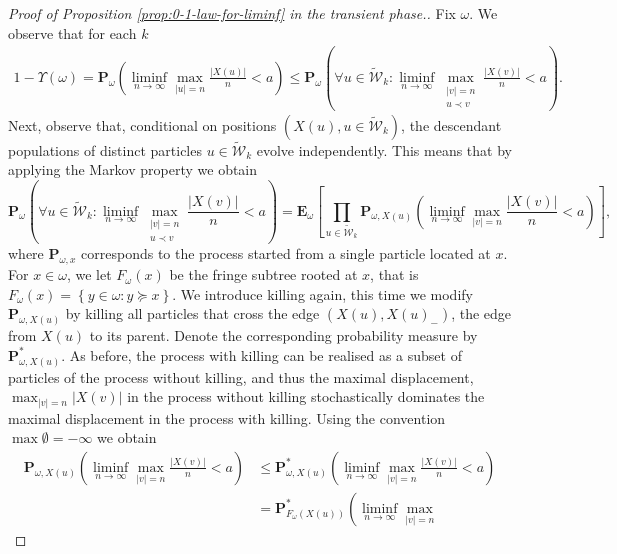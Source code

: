 \documentclass[11 pt]{article}
\theoremstyle{definition}
\numberwithin{equation}{section}
\begin{document}
\begin{proof}[Proof of Proposition \ref{prop:0-1-law-for-liminf} in the transient phase.]
	Fix $\omega$. We observe that for each $k$
	\begin{align*}
    		1-\Upsilon(\omega) = \mathbf{P}_\omega \left( \liminf_{n \to \infty} \max_{\vert u \vert =n} \frac{\vert
		 X(u) \vert}{n} <a\right) 
    		\leq \mathbf{P}_\omega \left( \forall u \in \widetilde{\mathcal{W}}_k: \liminf_{n \to \infty}
		 \max_{\substack{\vert v \vert =n \\ u \prec v}} \frac{\vert X(v) \vert}{n} < a\right).
	\end{align*}
	Next, observe that, conditional on positions $(X(u), u\in \widetilde{\mathcal{W}}_k)$, the descendant
 	populations of distinct particles $u\in \widetilde{\mathcal{W}}_k$ evolve independently. This means that by applying the Markov property we obtain
	\begin{equation*}
    		\mathbf{P}_\omega \left( \forall u \in \widetilde{\mathcal{W}}_k: \liminf_{n \to \infty} 
		\max_{\substack{\vert v \vert =n \\ u \prec v}} \frac{\vert X(v) \vert}{n} < a\right) = \mathbf{E}_{\omega}
		 \left[ \prod_{u \in \widetilde{\mathcal{W}}_k} \mathbf{P}_{\omega,{X(u)}} \left( \liminf_{n \to \infty}
		 \max_{\vert v \vert =n } \frac{\vert X(v) \vert}{n} < a\right)\right],
	\end{equation*}
	where $\mathbf{P}_{\omega,x}$ corresponds to the process started from a single particle located at $x$.
	For $x\in \omega$, we let $F_\omega(x)$ be the fringe subtree rooted at $x$, that is
	$F_\omega(x) = \left\{y \in \omega: y\succeq x \right\}.$ We introduce killing again, this time we modify 
	$ \mathbf{P}_{\omega,{X(u)}} $ by killing all particles that cross the edge $(X(u),X(u)_-)$, the edge from
	$X(u)$ to its parent. Denote the corresponding probability measure by $ \mathbf{P}_{\omega,{X(u)}}^*$.
	As before, the process with killing can be realised as a subset of particles of the process without killing, and thus the maximal displacement, $\max_{\vert v \vert=n} \vert X(v) \vert$ in the
	process without killing stochastically dominates the maximal displacement in the process with killing.
	Using the convention $\max \emptyset = -\infty$ we obtain
	\begin{align*}
    		\mathbf{P}_{\omega,{X(u)}} \left( \liminf_{n \to \infty} \max_{\vert v \vert =n } \frac{\vert X(v) \vert}{n} 
		< a\right) &\leq \mathbf{P}_{\omega,X(u)}^* \left( \liminf_{n \to \infty} \max_{\vert v \vert =n } 
		\frac{\vert X(v) \vert}{n} < a\right) \\
		&=  \mathbf{P}_{F_\omega(X(u))}^* \left( \liminf_{n \to \infty} \max_{\vert v \vert =n } 

\end{align*}
\end{proof}
\end{document}

